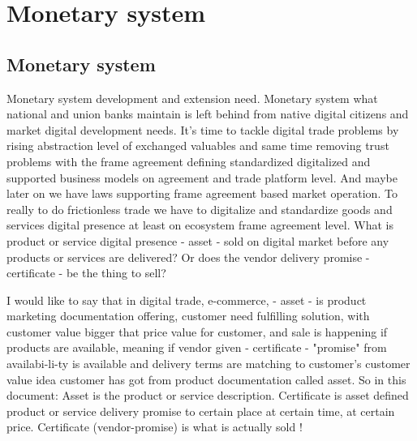 %
%
%
\part{Monetary system}
\chapter{Monetary system}
\label{monetary_system}
Monetary system development and extension need. Monetary system what national
and union banks maintain is left behind from native digital citizens and
market digital development needs. It's time to tackle digital trade problems
by rising abstraction level of exchanged valuables and same time removing
trust problems with the frame agreement defining standardized digitalized and
supported business models on agreement and trade platform level. And maybe
later on we have laws supporting frame agreement based market operation. To
really to do frictionless trade we have to digitalize and standardize goods
and services digital presence at least on ecosystem frame agreement level.
What is product or service digital presence - asset - sold on digital market
before any products or services are delivered? Or does the vendor delivery
promise - certificate - be the thing to sell?

I would like to say that in digital trade, e-commerce, - asset - is product
marketing documentation offering, customer need fulfilling solution, with
customer value bigger that price value for customer, and sale is happening if
products are available, meaning if vendor given - certificate - "promise" from
availabi-li-ty is available and delivery terms are matching to customer's
customer value idea customer has got from product documentation called asset.
So in this document: Asset is the product or service description. Certificate
is asset defined product or service delivery promise to certain place at
certain time, at certain price. Certificate (vendor-promise) is what is
actually sold !

